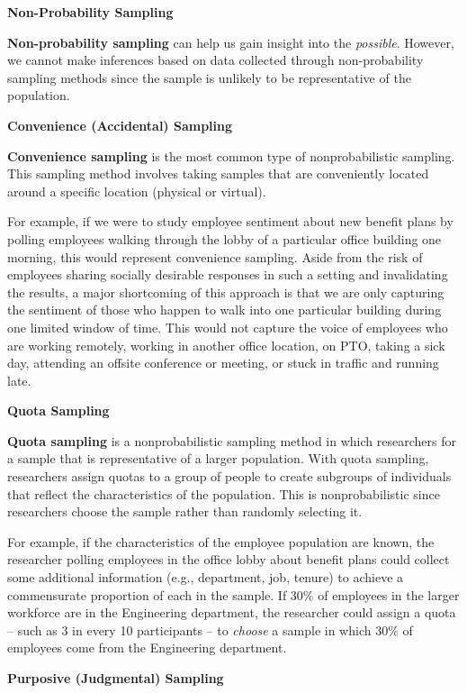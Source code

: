 \documentclass[]{book}
\begin{document}
\textbf{Non-Probability Sampling}

\textbf{Non-probability sampling} can help us gain insight into the \emph{possible}. However, we cannot make inferences based on data collected through non-probability sampling methods since the sample is unlikely to be representative of the population.

\textbf{Convenience (Accidental) Sampling}

\textbf{Convenience sampling} is the most common type of nonprobabilistic sampling. This sampling method involves taking samples that are conveniently located around a specific location (physical or virtual).

For example, if we were to study employee sentiment about new benefit plans by polling employees walking through the lobby of a particular office building one morning, this would represent convenience sampling. Aside from the risk of employees sharing socially desirable responses in such a setting and invalidating the results, a major shortcoming of this approach is that we are only capturing the sentiment of those who happen to walk into one particular building during one limited window of time. This would not capture the voice of employees who are working remotely, working in another office location, on PTO, taking a sick day, attending an offsite conference or meeting, or stuck in traffic and running late.

\textbf{Quota Sampling}

\textbf{Quota sampling} is a nonprobabilistic sampling method in which researchers for a sample that is representative of a larger population. With quota sampling, researchers assign quotas to a group of people to create subgroups of individuals that reflect the characteristics of the population. This is nonprobabilistic since researchers choose the sample rather than randomly selecting it.

For example, if the characteristics of the employee population are known, the researcher polling employees in the office lobby about benefit plans could collect some additional information (e.g., department, job, tenure) to achieve a commensurate proportion of each in the sample. If 30\% of employees in the larger workforce are in the Engineering department, the researcher could assign a quota -- such as 3 in every 10 participants -- to \emph{choose} a sample in which 30\% of employees come from the Engineering department.

\textbf{Purposive (Judgmental) Sampling}
\end{document}
